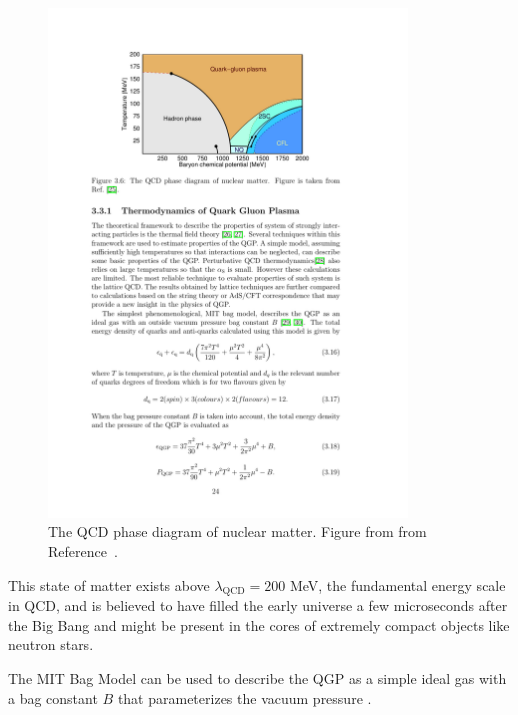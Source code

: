 \begin{figure}[htbp]
\begin{center}
\includegraphics[width=0.85\textwidth]{figures/theory/qcd_phase}
\caption{The QCD phase diagram of nuclear matter. Figure from from Reference~\cite{PhysRevD.72.034004}. }
\label{fig:qgp_form}
\end{center}
\end{figure}

This state of matter exists above $\lambda_{\mathrm{QCD}} = 200$ MeV, the fundamental energy scale in QCD, and is believed to have filled the early universe a few microseconds after the Big Bang \cite{23, 24} and might be present in the cores of extremely compact objects like neutron stars. 

The MIT Bag Model can be used to describe the QGP as a simple ideal gas with a bag constant $B$ that parameterizes the vacuum pressure \cite{Muller1993, Yagi:2005yb}.

